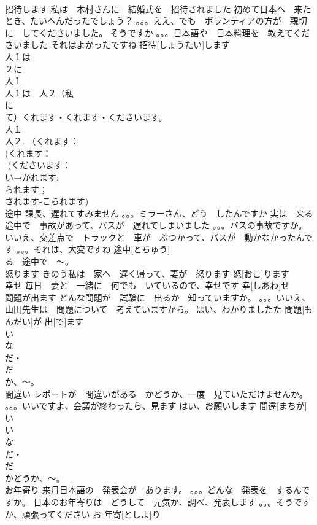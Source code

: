 \documentclass[8pt]{extreport}
\begin{document}
\begin{CJK}{UTF8}{min}
\\	招待します	私は　木村さんに　結婚式を　招待されました 初めて日本へ　来たとき、たいへんだったでしょう？ 。。。ええ、でも　ボランティアの方が　親切に　してくださいました。 そうですか 。。。日本語や　日本料理を　教えてくださいました それはよかったですね	招待[しょうたい]します			
\\	人１は
\\	２に
\\	人１
\\	人１は　人２（私
\\	に　
\\	て）くれます・くれます・くださいます。
\\	人１
\\	人２. （くれます：
\\	(くれます：
\\	-(くださいます：
\\	い→かれます;
\\	られます；
\\	されます-こられます)
\\	途中	課長、遅れてすみません 。。。ミラーさん、どう　したんですか 実は　来る途中で　事故があって、バスが　遅れてしまいました 。。。バスの事故ですか。 いいえ、交差点で　トラックと　車が　ぶつかって、バスが　動かなかったんです 。。。それは、大変ですね	途中[とちゅう]			
\\	る　途中で　～。
\\	怒ります	きのう私は　家へ　遅く帰って、妻が　怒ります	怒[おこ]ります			
\\	幸せ	毎日　妻と　一緒に　何でも　いているので、幸せです	幸[しあわ]せ			
\\	問題が出ます	どんな問題が　試験に　出るか　知っていますか。 。。。いいえ、山田先生は　問題について　考えていますから。 はい、わかりましたた	問題[もんだい]が 出[で]ます			
\\	い　
\\	な
\\	だ・
\\	だ 
\\	か、～。
\\	間違い	レポートが　間違いがある　かどうか、一度　見ていただけませんか。 。。。いいですよ、会議が終わったら、見ます はい、お願いします	間違[まちが]い				
\\	い　
\\	な
\\	だ・
\\	だ 
\\	かどうか、～。
\\	お年寄り	来月日本語の　発表会が　あります。 。。。どんな　発表を　するんですか。 日本のお年寄りは　どうして　元気か、調べ、発表します 。。。そうですか、頑張ってください	お 年寄[としよ]り			

\end{CJK}
\end{document}

